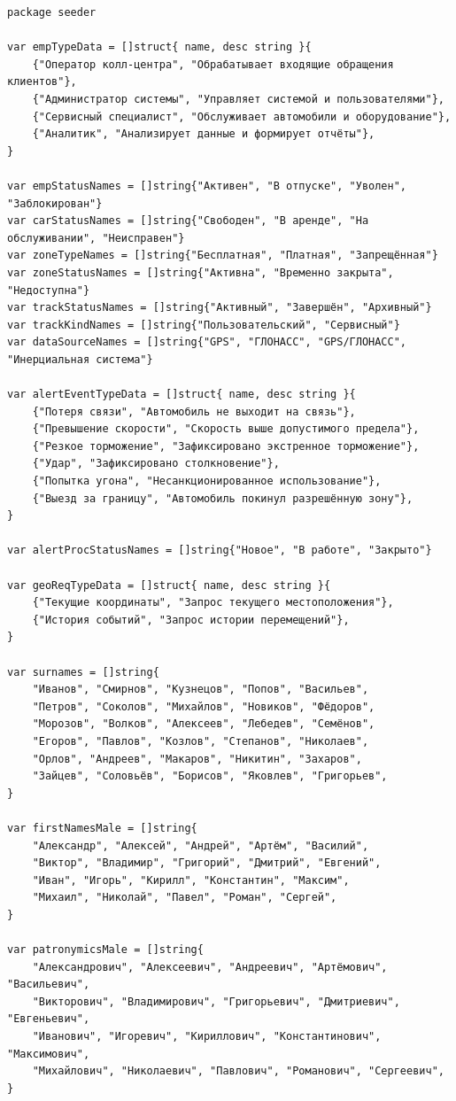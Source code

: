 \begin{lstlisting}[style=gostyle, caption={Статические данные для генерации (internal/seeder/data.go)}, label={lst:goData}]
package seeder

var empTypeData = []struct{ name, desc string }{
	{"Оператор колл-центра", "Обрабатывает входящие обращения клиентов"},
	{"Администратор системы", "Управляет системой и пользователями"},
	{"Сервисный специалист", "Обслуживает автомобили и оборудование"},
	{"Аналитик", "Анализирует данные и формирует отчёты"},
}

var empStatusNames = []string{"Активен", "В отпуске", "Уволен", "Заблокирован"}
var carStatusNames = []string{"Свободен", "В аренде", "На обслуживании", "Неисправен"}
var zoneTypeNames = []string{"Бесплатная", "Платная", "Запрещённая"}
var zoneStatusNames = []string{"Активна", "Временно закрыта", "Недоступна"}
var trackStatusNames = []string{"Активный", "Завершён", "Архивный"}
var trackKindNames = []string{"Пользовательский", "Сервисный"}
var dataSourceNames = []string{"GPS", "ГЛОНАСС", "GPS/ГЛОНАСС", "Инерциальная система"}

var alertEventTypeData = []struct{ name, desc string }{
	{"Потеря связи", "Автомобиль не выходит на связь"},
	{"Превышение скорости", "Скорость выше допустимого предела"},
	{"Резкое торможение", "Зафиксировано экстренное торможение"},
	{"Удар", "Зафиксировано столкновение"},
	{"Попытка угона", "Несанкционированное использование"},
	{"Выезд за границу", "Автомобиль покинул разрешённую зону"},
}

var alertProcStatusNames = []string{"Новое", "В работе", "Закрыто"}

var geoReqTypeData = []struct{ name, desc string }{
	{"Текущие координаты", "Запрос текущего местоположения"},
	{"История событий", "Запрос истории перемещений"},
}

var surnames = []string{
	"Иванов", "Смирнов", "Кузнецов", "Попов", "Васильев",
	"Петров", "Соколов", "Михайлов", "Новиков", "Фёдоров",
	"Морозов", "Волков", "Алексеев", "Лебедев", "Семёнов",
	"Егоров", "Павлов", "Козлов", "Степанов", "Николаев",
	"Орлов", "Андреев", "Макаров", "Никитин", "Захаров",
	"Зайцев", "Соловьёв", "Борисов", "Яковлев", "Григорьев",
}

var firstNamesMale = []string{
	"Александр", "Алексей", "Андрей", "Артём", "Василий",
	"Виктор", "Владимир", "Григорий", "Дмитрий", "Евгений",
	"Иван", "Игорь", "Кирилл", "Константин", "Максим",
	"Михаил", "Николай", "Павел", "Роман", "Сергей",
}

var patronymicsMale = []string{
	"Александрович", "Алексеевич", "Андреевич", "Артёмович", "Васильевич",
	"Викторович", "Владимирович", "Григорьевич", "Дмитриевич", "Евгеньевич",
	"Иванович", "Игоревич", "Кириллович", "Константинович", "Максимович",
	"Михайлович", "Николаевич", "Павлович", "Романович", "Сергеевич",
}


\end{lstlisting}
